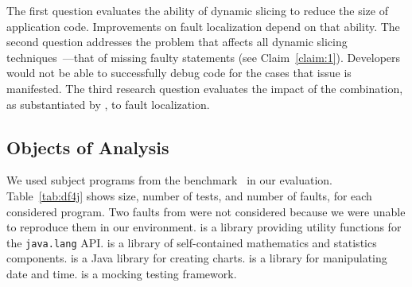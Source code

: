 \documentclass{article}
\begin{document}
The first question evaluates the ability of dynamic slicing to reduce
the size of application code. Improvements on fault localization
depend on that ability. The second question addresses the problem that
affects all dynamic slicing
techniques~\cite{Lin:2018:BDE:3238147.3238163}---that of missing
faulty statements (see Claim~\ref{claim:1}). Developers would
not be able to successfully debug code for the cases that issue is
manifested. The third research question evaluates the impact of the
combination, as substantiated by \comb, to fault localization.


%
%
\subsection{Objects of Analysis}\label{sec:analysis}


We used subject programs from the \dfj{}
benchmark~\cite{just-defects4j-issta2014} in our evaluation.
Table~\ref{tab:df4j} shows size, number of tests, and number of
faults, for each considered program. Two faults from \cmath{} were not
considered because we were unable to reproduce them in our
environment. \lang{} is a library providing utility functions for the
     {\small\texttt{java.lang}} API. \cmath{} is a library of
     self-contained mathematics and statistics components. \chart{} is a Java library for creating charts.
     \jtime{} is a library for manipulating date and time. \mockito{} is a mocking
     testing framework.
\end{document}
